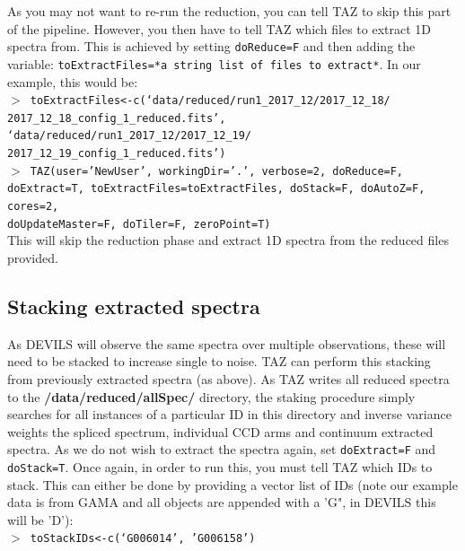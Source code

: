 \documentclass[12pt]{article}
\begin{document}
As you may not want to re-run the reduction, you can tell TAZ to skip this part of the pipeline. However, you then have to tell TAZ which files to extract 1D spectra from. This is achieved by setting  \texttt{doReduce=F} and then adding the variable: \texttt{toExtractFiles=*a string list of files to extract*}. In our example, this would be:\\

 \hspace{10mm} \texttt{$>$ toExtractFiles<-c(`data/reduced/run1\_2017\_12/2017\_12\_18/ \\ 2017\_12\_18\_config\_1\_reduced.fits', `data/reduced/run1\_2017\_12/2017\_12\_19/ \\ 2017\_12\_19\_config\_1\_reduced.fits')}\\
 
  \hspace{10mm} \texttt{$>$ TAZ(user='NewUser', workingDir='.', verbose=2, doReduce=F, doExtract=T, toExtractFiles=toExtractFiles, doStack=F, doAutoZ=F, cores=2, \\ doUpdateMaster=F, doTiler=F, zeroPoint=T)}\\

 This will skip the reduction phase and extract 1D spectra from the reduced files provided.
 
 \subsection{Stacking extracted spectra}
 
 As DEVILS will observe the same spectra over multiple observations, these will need to be stacked to increase single to noise. TAZ can perform this stacking from previously extracted spectra (as above). As TAZ writes all reduced spectra to the \textbf{/data/reduced/allSpec/} directory, the staking procedure simply searches for all instances of a particular ID in this directory and inverse variance weights the spliced spectrum, individual CCD arms and continuum extracted spectra. As we do not wish to extract the spectra again, set \texttt{doExtract=F} and \texttt{doStack=T}. Once again, in order to run this, you must tell TAZ which IDs to stack. This can either be done by providing a vector list of IDs (note our example data is from GAMA and all objects are appended with a 'G", in DEVILS this will be 'D'):\\
 
   \hspace{10mm} \texttt{$>$ toStackIDs<-c(`G006014', 'G006158')}\\
 
\end{document}
